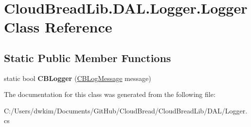 \hypertarget{a00129}{}\section{Cloud\+Bread\+Lib.\+D\+A\+L.\+Logger.\+Logger Class Reference}
\label{a00129}
\subsection*{Static Public Member Functions}
\begin{DoxyCompactItemize}
\item 
static bool {\bfseries C\+B\+Logger} (\hyperlink{a00044}{C\+B\+Log\+Message} message)\hypertarget{a00129_ad9c33ab1f20fe8a8d49bd258d50b1738}{}\label{a00129_ad9c33ab1f20fe8a8d49bd258d50b1738}

\end{DoxyCompactItemize}


The documentation for this class was generated from the following file\+:\begin{DoxyCompactItemize}
\item 
C\+:/\+Users/dwkim/\+Documents/\+Git\+Hub/\+Cloud\+Bread/\+Cloud\+Bread\+Lib/\+D\+A\+L/Logger.\+cs\end{DoxyCompactItemize}
